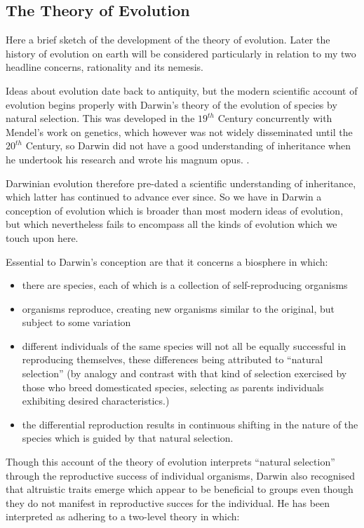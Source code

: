 \documentclass[10pt,titlepage]{book}
\begin{document}
\subsection{The Theory of Evolution}

Here a brief sketch of the development of the theory of evolution.
Later the history of evolution on earth will be considered particularly in relation to my two headline concerns, rationality and its nemesis.

Ideas about evolution date back to antiquity, but the modern scientific account of evolution begins properly with Darwin's theory of the evolution of species by natural selection.
This was developed in the $19^{th}$ Century concurrently with Mendel's work on genetics, which however was not widely disseminated until the $20^{th}$ Century, so Darwin did not have a good understanding of inheritance when he undertook his research and wrote his magnum opus. \cite{darwin-oos}.

Darwinian evolution therefore pre-dated a scientific understanding of inheritance, which latter has continued to advance ever since.
So we have in Darwin a conception of evolution which is broader than most modern ideas of evolution, but which nevertheless fails to encompass all the kinds of evolution which we touch upon here.

Essential to Darwin's conception are that it concerns a biosphere in which:
\begin{itemize}
  \item there are species, each of which is a collection of self-reproducing organisms
  \item organisms reproduce, creating new organisms similar to the original, but subject to some variation
  \item different individuals of the same species will not all be equally successful in reproducing themselves, these differences being attributed to ``natural selection'' (by analogy and contrast with that kind of selection exercised by those who breed domesticated species, selecting as parents individuals exhibiting desired characteristics.)
  \item the differential reproduction results in continuous shifting in the nature of the species which is guided by that natural selection.
\end{itemize}

Though this account of the theory of evolution interprets ``natural selection'' through the reproductive success of individual organisms, Darwin also recognised that altruistic traits emerge which appear to be beneficial to groups even though they do not manifest in reproductive succes for the individual.
He has been interpreted as adhering to a two-level theory in which:
\end{document}
